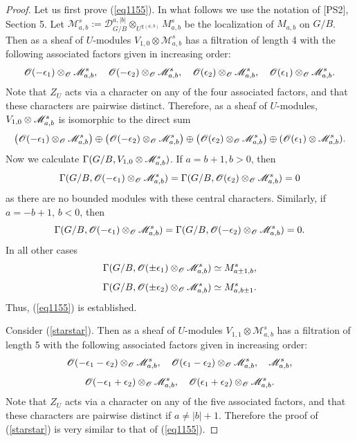 \documentclass[12pt]{amsart}
\theoremstyle{plain} %
\newcommand {\DD} {\mathscr {D}}
\newcommand {\OO} {\mathscr {O}}
\newcommand {\MM} {\mathscr {M}}
\newcommand{\eps}{\epsilon}
\newcommand {\eqdef} {:=}
\newcommand{\refeq}[1]{(\ref{#1})}
\newcommand {\univ} {U}
\begin{document}
\begin{proof}
Let us first prove \refeq{eq1155}. In what follows we use the notation of [PS2], Section 5. Let
$\MM_{a,b}^s\eqdef\DD_{G/B}^{a,|b|}\otimes_{\univ^{\chi(a,b)}}M_{a,b}^s$
be the localization of $M_{a,b}$ on $G/B$.
Then as a sheaf of $\univ$-modules $V_{1,0}\otimes\MM_{a,b}^s$ has a filtration of length 4 with the following associated factors given in increasing order:
\[
\OO(-\eps_1)\otimes_\OO \mabs, \quad \OO(-\eps_2)\otimes_\OO\mabs,\quad
\OO(\eps_2)\otimes_\OO\mabs,\quad \OO(\eps_1)\otimes_\OO\mabs.
\]
Note that $Z_\univ$ acts via a character on any of the four associated
 factors, and that these characters are pairwise distinct.
 Therefore, as a sheaf of $\univ$-modules, $V_{1,0}\otimes\mabs$ is isomorphic to the direct sum
\[
\left(\OO(-\eps_1)\otimes_\OO \mabs\right) \oplus \left(\OO(-\eps_2)
\otimes_\OO\mabs\right)\oplus\left( \OO(\eps_2)\otimes_\OO\mabs\right)
\oplus(\OO(\eps_1)\otimes\mabs).
\]
Now we calculate $\Gamma(G/B,V_{1,0}\otimes\mabs)$. If $a=b+1,b>0$, then
$$\Gamma(G/B,\OO(-\eps_1)\otimes_\OO \mabs)=
\Gamma(G/B,\OO(\eps_2)\otimes_\OO \mabs)=0$$
 as there are no bounded modules with these central characters. Similarly, if
$a=-b+1$, $b<0$, then
$$\Gamma(G/B,\OO(-\eps_1)\otimes_\OO \mabs)=
\Gamma(G/B,\OO(-\eps_2)\otimes_\OO \mabs)=0.$$
In all other cases
$$\Gamma(G/B,\OO(\pm\eps_1)\otimes_\OO \mabs)\simeq M^s_{a\pm 1,b},$$
$$\Gamma(G/B,\OO(\pm\eps_2)\otimes_\OO \mabs)\simeq M^s_{a,b \pm 1}.$$
Thus, \refeq{eq1155} is established.


Consider \refeq{starstar}. Then as a sheaf of $\univ$-modules $V_{1,1}\otimes\MM_{a,b}^s$ has a filtration of length 5 with the following associated factors given in increasing order:
\[
\OO(-\eps_1-\eps_2)\otimes_\OO \mabs, \quad \OO(\eps_1-\eps_2)\otimes_\OO\mabs, \quad \mabs,
\]
\[
\OO(-\eps_1+\eps_2)\otimes_\OO\mabs,\quad \OO(\eps_1+\eps_2)\otimes_\OO\mabs.
\]
Note that $Z_\univ$ acts via a character on any of the five associated
factors, and that these characters are pairwise distinct if $a\neq
|b|+1$. Therefore the proof of \refeq{starstar} is very similar to that of \refeq{eq1155}.


\end{proof}
\end{document}
